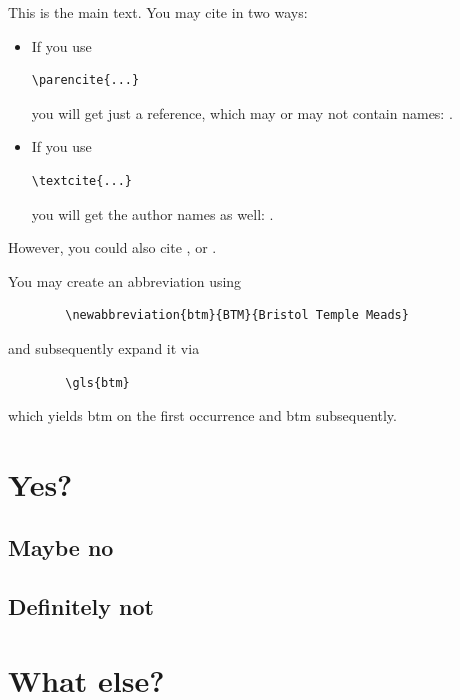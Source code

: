 This is the main text. You may cite in two ways:
\begin{itemize}
  \item If you use \begin{verbatim}\parencite{...}\end{verbatim} you will get just a reference, which may
    or may not contain names: \parencite{Qian2021}.
  \item If you use \begin{verbatim}\textcite{...}\end{verbatim} you will get the author names as well: \textcite{Qian2021}.
\end{itemize}

However, you could also cite \textcite{Sayama2020}, or \textcite{Bullock2023}.

You may create an abbreviation using 
\begin{center}
    \begin{verbatim}
        \newabbreviation{btm}{BTM}{Bristol Temple Meads}
    \end{verbatim}
\end{center}
and subsequently expand it via
\begin{center}
    \begin{verbatim}
        \gls{btm}
    \end{verbatim}
\end{center}
which yields \gls{btm} on the first occurrence and \gls{btm} subsequently.

\lipsum[1-2]

\section{Yes?}

\subsection{Maybe no}

  \lipsum[3]

\subsection{Definitely not}
  \lipsum[4]
  
\section{What else?}
  \lipsum[5-13]

